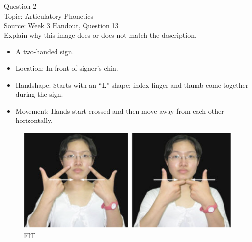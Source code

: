 \documentclass[12pt]{article}
\begin{document}
\newpage

{\large Question 2}\\

Topic: Articulatory Phonetics\\
Source: Week 3 Handout, Question 13\\

Explain why this image does or does not match the description.\\

\begin{itemize} \item A two-handed sign. \item Location: In front of signer’s chin. \item Handshape: Starts with an “L” shape; index finger and thumb come together during the sign. \item Movement: Hands start crossed and then move away from each other horizontally. \end{itemize}

\begin{figure}[H]
\includegraphics{../images/taiwansign_fit.png}
\caption{FIT}
\end{figure}

\newpage

\begin{center}
\textbf{{\color{red}{\HUGE END OF EXAM}}}\\

\end{center}
\newpage
\end{document}
